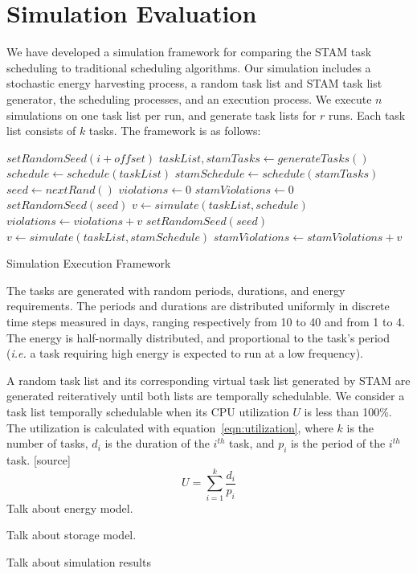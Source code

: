 \section{Simulation Evaluation} \label{sec:simulation}

We have developed a simulation framework for comparing the \textsc{STAM} task scheduling to traditional scheduling algorithms.  Our simulation includes a stochastic energy harvesting process, a random task list and \textsc{STAM} task list generator, the scheduling processes, and an execution process.  We execute $n$ simulations on one task list per run, and generate task lists for $r$ runs.  Each task list consists of $k$ tasks.  The framework is as follows:

\begin{algorithm}[h]
\begin{algorithmic}
\STATE $setRandomSeed(i + offset)$
\STATE $taskList, stamTasks \gets generateTasks()$
\STATE $schedule \gets schedule(taskList)$
\STATE $stamSchedule \gets schedule(stamTasks)$
\STATE $seed \gets nextRand()$
\STATE $violations \gets 0$
\STATE $stamViolations \gets 0$
\STATE $setRandomSeed(seed)$
\STATE $v \gets simulate(taskList, schedule)$
\STATE $violations \gets violations + v$
\ENDFOR
\STATE $setRandomSeed(seed)$
\STATE $v \gets simulate(taskList, stamSchedule)$
\STATE $stamViolations \gets stamViolations + v$
\ENDFOR
\ENDFOR
\end{algorithmic}
\caption{Simulation Execution Framework}
\end{algorithm}

The tasks are generated with random periods, durations, and energy requirements.  The periods and durations are distributed uniformly in discrete time steps measured in days, ranging respectively from 10 to 40 and from 1 to 4.  The energy is half-normally distributed, and proportional to the task's period (\emph{i.e.} a task requiring high energy is expected to run at a low frequency).

A random task list and its corresponding virtual task list generated by \textsc{STAM} are generated reiteratively until both lists are temporally schedulable.  We consider a task list temporally schedulable when its CPU utilization $U$ is less than 100\%.  The utilization is calculated with equation~\ref{eqn:utilization}, where $k$ is the number of tasks, $d_i$ is the duration of the $i^{th}$ task, and $p_i$ is the period of the $i^{th}$ task. [source]
\begin{equation}
\label{eqn:utilization}
U = \sum_{i=1}^{k} \frac{d_i}{p_i}
\end{equation}
Talk about energy model.

Talk about storage model.

Talk about simulation results